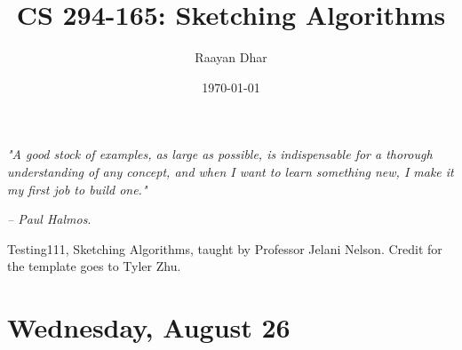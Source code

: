 \documentclass[11 pt]{scrartcl}
\begin{document}
 
\title{\Large CS 294-165: Sketching Algorithms}
\author{\large Raayan Dhar}
\date{\large\today}

\maketitle 

\begin{center}
\begin{displayquote}
    \emph{"A good stock of examples, as large as possible, is indispensable for a thorough understanding of any concept, and when I want to learn something new, I make it my first job to build one."} \\ \begin{flushright} \emph{– Paul Halmos}.  \end{flushright}
\end{displayquote}
\end{center}


Testing111, Sketching Algorithms, taught by Professor Jelani Nelson. Credit for the template goes to Tyler Zhu.

\tableofcontents 

\newpage

\section{Wednesday, August 26}
\end{document}
